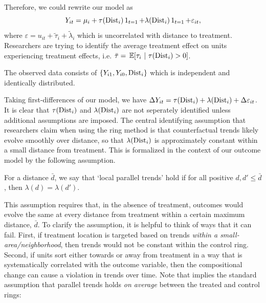 Therefore, we could rewrite our model as 
\begin{equation}\label{eq:model}
    Y_{it} = \mu_i + \tau(\dist_i) \one_{t = 1} + \lambda(\dist_i) \one_{t=1} + \varepsilon_{it},   
\end{equation}
where $\varepsilon = u_{it} + \tilde{\tau}_i + \tilde{\lambda}_i$ which is uncorrelated with distance to treatment. Researchers are trying to identify the average treatment effect on units experiencing treatment effects, i.e. $\bar{\tau} = \expec{\tau_i}{\tau(\dist_i) > 0}$.

\begin{assumption}
    The observed data consists of $\{ Y_{i1}, Y_{i0}, \text{Dist}_{i}\}$ which is independent and identically distributed.
\end{assumption}

Taking first-differences of our model, we have $\Delta Y_{it} = \tau(\text{Dist}_i) + \lambda(\text{Dist}_i) + \Delta \varepsilon_{it}$. It is clear that $\tau(\text{Dist}_i)$ and $\lambda(\text{Dist}_i)$ are not seperately identified unless additional assumptions are imposed. The central identifying assumption that researchers claim when using the ring method is that counterfactual trends likely evolve smoothly over distance, so that $\lambda(\text{Dist}_i)$ is approximately constant within a small distance from treatment. This is formalized in the context of our outcome model by the following assumption. 

\begin{assumption}\label{assum:parallel}
    For a distance $\bar{d}$, we say that `local parallel trends' hold if for all positive $d, d' \leq \bar{d}$, then $\lambda(d) = \lambda(d')$.
\end{assumption}

This assumption requires that, in the absence of treatment, outcomes would evolve the same at every distance from treatment within a certain maximum distance, $\bar{d}$. To clarify the assumption, it is helpful to think of ways that it can fail. First, if treatment location is targeted based on trends \textit{within a small-area/neighborhood}, then trends would not be constant within the control ring. Second, if units sort either towards or away from treatment in a way that is systematically correlated with the outcome variable, then the compositional change can cause a violation in trends over time. Note that  implies the standard assumption that parallel trends holds \textit{on average} between the treated and control rings:

